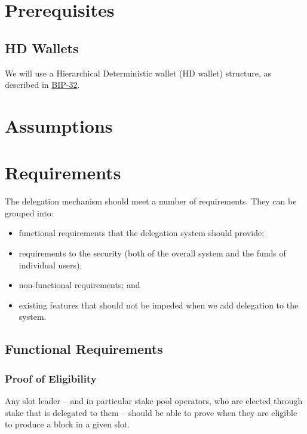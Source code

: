 \documentclass[11pt,a4paper]{article}
\begin{document}
\section{Prerequisites}\label{prerequisites}

\subsection{HD Wallets}\label{hd-wallets}

We will use a Hierarchical Deterministic wallet (HD wallet) structure,
as described in
\href{https://github.com/bitcoin/bips/blob/master/bip-0032.mediawiki.}{BIP-32}.

\section{Assumptions}\label{assumptions}

\section{Requirements}\label{requirements}

The delegation mechanism should meet a number of requirements. They can
be grouped into:

\begin{itemize}
\item
  functional requirements that the delegation system should provide;
\item
  requirements to the security (both of the overall system and the funds
  of individual users);
\item
  non-functional requirements; and
\item
  existing features that should not be impeded when we add delegation to
  the system.
\end{itemize}

\subsection{Functional Requirements}\label{functional-requirements}

\subsubsection{Proof of Eligibility}\label{proof-of-eligibility}

Any slot leader -- and in particular stake pool operators, who are
elected through stake that is delegated to them -- should be able to
prove when they are eligible to produce a block in a given slot.
\end{document}
